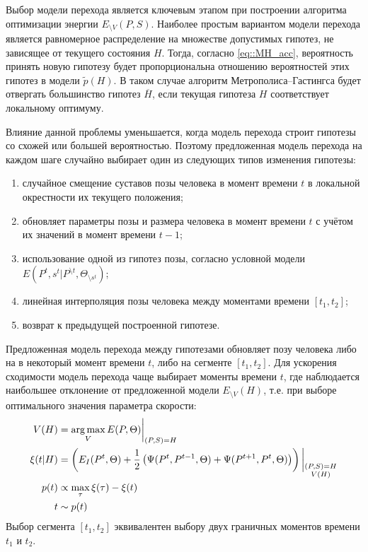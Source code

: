 Выбор модели перехода является ключевым этапом при построении алгоритма оптимизации энергии $E_{\setminus V}(P, S)$. Наиболее простым вариантом модели перехода является равномерное распределение на множестве допустимых гипотез, не зависящее от текущего состояния $H$. Тогда, согласно \eqref{eq::MH_acc}, вероятность принять новую гипотезу будет пропорциональна отношению вероятностей этих гипотез в модели $\tilde{p}(H)$. В таком случае алгоритм Метрополиса--Гастингса будет отвергать большинство гипотез $\overline{H}$, если текущая гипотеза $H$ соответствует локальному оптимуму.

Влияние данной проблемы уменьшается, когда модель перехода строит гипотезы со схожей или большей вероятностью. Поэтому предложенная модель перехода на каждом шаге случайно выбирает один из следующих типов изменения гипотезы:
\begin{enumerate}
	\item случайное смещение суставов позы человека в момент времени $t$ в локальной окрестности их текущего положения;
	\item обновляет параметры позы и размера человека в момент времени $t$ с учётом их значений в момент времени $t-1$;
	\item использование одной из гипотез позы, согласно условной модели $E(P^t, s^t | P^{\setminus t}, \Theta_{\setminus s^t})$;
	\item линейная интерполяция позы человека между моментами времени $\left[t_1,t_2\right]$;
	\item возврат к предыдущей построенной гипотезе.
\end{enumerate}

Предложенная модель перехода между гипотезами обновляет позу человека либо на в некоторый момент времени $t$, либо на сегменте $\left[t_1, t_2\right]$. Для ускорения сходимости модель перехода чаще выбирает моменты времени $t$, где наблюдается наибольшее отклонение от предложенной модели $E_{\setminus V}(H)$, т.е. при выборе оптимального значения параметра скорости:
\begin{equation}
	\begin{aligned}
		V(H) &= \operatorname*{arg\,max}_V{E(P, \Theta)\bigg\rvert_{(P, S) = H}} \\
		\xi(t | H) &= \left(E_I(P^t, \Theta) + \frac{1}{2} \left(\Psi(P^t, P^{t-1}, \Theta) + \Psi(P^{t+1}, P^t, \Theta)\right) \right)\bigg\rvert_{\substack{(P, S) = H \\ V(H)}} \\
		p(t) &\propto \max_\tau \xi(\tau) - \xi(t) \\
		t &\sim p(t)	
	\end{aligned}
\end{equation}
Выбор сегмента $\left[t_1, t_2\right]$ эквивалентен выбору двух граничных моментов времени $t_1$ и $t_2$.

